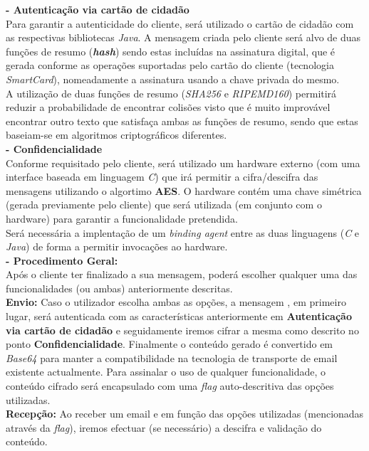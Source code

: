 \documentclass[times, 10pt,twocolumn]{article}
\begin{document}
\noindent \textbf{- Autentica\c{c}\~ao via cart\~ao de cidad\~ao}\\
\indent Para garantir a autenticidade do cliente, ser\'a utilizado o cart\~ao de cidad\~ao com as respectivas bibliotecas \emph{Java}. A mensagem criada pelo cliente ser\'a alvo de duas fun\c{c}\~oes de resumo (\textbf{\emph{hash}}) sendo estas inclu\'idas na assinatura digital, que \'e gerada conforme as opera\c{c}\~oes suportadas pelo cart\~ao do cliente (tecnologia \emph{SmartCard}), nomeadamente a assinatura usando a chave privada do mesmo. \\
\indent A utiliza\c{c}\~ao de duas fun\c{c}\~oes de resumo (\emph{SHA256} e \emph{RIPEMD160}) permitir\'a reduzir a probabilidade de encontrar colis\~oes visto que \'e muito improv\'avel encontrar outro texto que satisfa\c{c}a ambas as fun\c{c}\~oes de resumo, sendo que estas baseiam-se em algoritmos criptogr\'aficos diferentes.\\

\noindent \textbf{- Confidencialidade}\\
\indent Conforme requisitado pelo cliente, ser\'a utilizado um hardware externo (com uma interface baseada em linguagem \emph{C}) que ir\'a permitir a cifra/descifra das mensagens utilizando o algortimo \textbf{AES}. O hardware cont\'em uma chave sim\'etrica (gerada previamente pelo cliente) que ser\'a utilizada (em conjunto com o hardware) para garantir a funcionalidade pretendida.\\
\indent Ser\'a necess\'aria a implenta\c{c}\~ao de um \emph{binding agent} entre as duas linguagens (\emph{C} e \emph{Java}) de forma a permitir invoca\c{c}\~oes ao hardware.\\

\noindent \textbf{- Procedimento Geral:} \\
\indent Ap\'os o cliente ter finalizado a sua mensagem, poder\'a escolher qualquer uma das funcionalidades (ou ambas) anteriormente descritas. \\
\indent \indent \textbf{Envio:} Caso o utilizador escolha ambas as op\c{c}\~oes, a mensagem , em primeiro lugar, ser\'a autenticada com as caracter\'isticas anteriormente em \textbf{Autentica\c{c}\~ao via cart\~ao de cidad\~ao}  e seguidamente iremos cifrar a mesma como descrito no ponto \textbf{Confidencialidade}. Finalmente o conte\'udo gerado \'e convertido em \emph{Base64} para manter a compatibilidade na tecnologia de transporte de email existente actualmente. Para assinalar o uso de qualquer funcionalidade, o conte\'udo cifrado ser\'a encapsulado com uma \emph{flag} auto-descritiva das op\c{c}\~oes utilizadas.\\
\indent \indent \textbf{Recep\c{c}\~ao:} Ao receber um email e em fun\c{c}\~ao das op\c{c}\~oes utilizadas (mencionadas atrav\'es da \emph{flag}), iremos efectuar (se necess\'ario) a descifra e valida\c{c}\~ao do conte\'udo.
\end{document}
